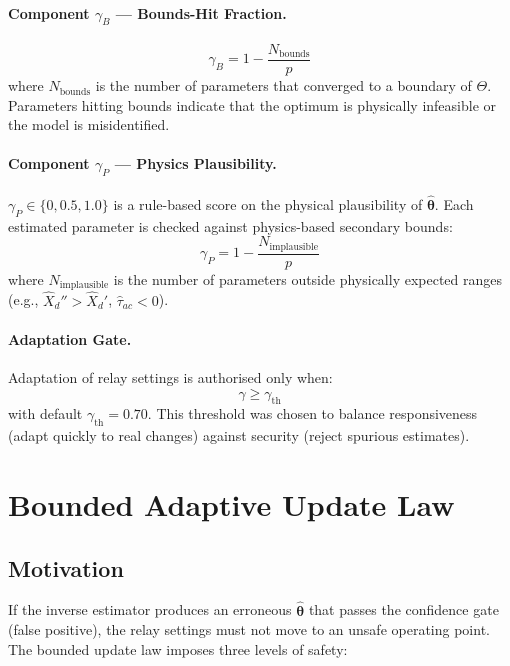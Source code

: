\paragraph{Component $\gamma_B$ --- Bounds-Hit Fraction.}
\begin{equation}
  \gamma_B = 1 - \frac{N_\mathrm{bounds}}{p}
  \label{eq:ch2_gamma_b}
\end{equation}
where $N_\mathrm{bounds}$ is the number of parameters that converged to
a boundary of $\Theta$. Parameters hitting bounds indicate that the
optimum is physically infeasible or the model is misidentified.

\paragraph{Component $\gamma_P$ --- Physics Plausibility.}
$\gamma_P \in \{0, 0.5, 1.0\}$ is a rule-based score on the
physical plausibility of $\hat{\bm{\theta}}$. Each estimated parameter
is checked against physics-based secondary bounds:
\begin{equation}
  \gamma_P = 1 - \frac{N_\mathrm{implausible}}{p}
  \label{eq:ch2_gamma_p}
\end{equation}
where $N_\mathrm{implausible}$ is the number of parameters outside
physically expected ranges (e.g., $\hat{X}_d'' > \hat{X}_d'$,
$\hat{\tau}_{ac} < 0$).

\paragraph{Adaptation Gate.}
Adaptation of relay settings is authorised only when:
\begin{equation}
  \gamma \geq \gamma_\mathrm{th}
  \label{eq:ch2_gate}
\end{equation}
with default $\gamma_\mathrm{th} = 0.70$.
This threshold was chosen to balance responsiveness (adapt quickly to
real changes) against security (reject spurious estimates).

\section{Bounded Adaptive Update Law}
\label{sec:ch2_update}

\subsection{Motivation}

If the inverse estimator produces an erroneous $\hat{\bm{\theta}}$ that
passes the confidence gate (false positive), the relay settings must not
move to an unsafe operating point. The bounded update law imposes three
levels of safety:

